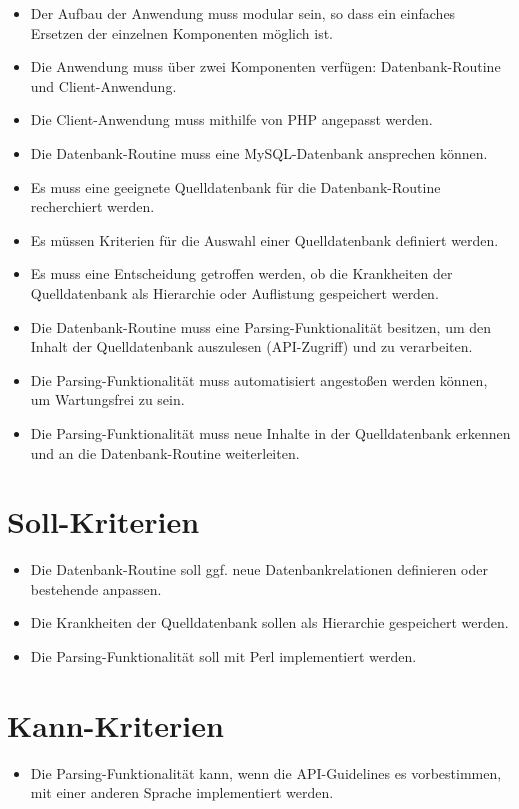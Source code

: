 \begin{itemize}
\item{Der Aufbau der Anwendung muss modular sein, so dass ein einfaches Ersetzen der einzelnen Komponenten möglich ist.}
\item{Die Anwendung muss über zwei Komponenten verfügen: Datenbank-Routine und Client-Anwendung.}
\item{Die Client-Anwendung muss mithilfe von PHP angepasst werden.}
\item{Die Datenbank-Routine muss eine MySQL-Datenbank ansprechen können.}
\item{Es muss eine geeignete Quelldatenbank für die Datenbank-Routine recherchiert werden.}
\item{Es müssen Kriterien für die Auswahl einer Quelldatenbank definiert werden.}
\item{Es muss eine Entscheidung getroffen  werden, ob die Krankheiten der Quelldatenbank als Hierarchie oder Auflistung gespeichert werden.}
\item{Die Datenbank-Routine muss eine Parsing-Funktionalität besitzen, um den Inhalt der Quelldatenbank auszulesen (API-Zugriff) und zu verarbeiten.}
\item{Die Parsing-Funktionalität muss automatisiert angestoßen werden können, um Wartungsfrei zu sein.}
\item{Die Parsing-Funktionalität muss neue Inhalte in der Quelldatenbank erkennen und an die Datenbank-Routine weiterleiten.}
\end{itemize}

\section*{Soll-Kriterien}

\begin{itemize}
\item{Die Datenbank-Routine soll ggf. neue Datenbankrelationen definieren oder bestehende anpassen.}
\item{Die Krankheiten der Quelldatenbank sollen als Hierarchie gespeichert werden.}
\item{Die Parsing-Funktionalität soll mit Perl implementiert werden.}
\end{itemize}

\section*{Kann-Kriterien}

\begin{itemize}
\item{Die Parsing-Funktionalität kann, wenn die API-Guidelines es vorbestimmen, mit einer anderen Sprache implementiert werden.}
\end{itemize}
